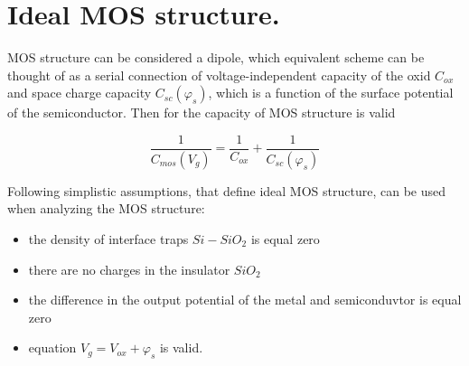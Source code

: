 \iffalse
\section{Ideálna štruktúra MOS.}  \index{MOS!ideálna štruktúra}
Štruktúru MOS možno považovať za dvojpól, ktorého náhradnú schému si
možno predstaviť ako sériové zapojenie napäťovonezávislej kapacity
oxidu $C_{ox}$ a kapacity oblasti priestorového náboja (OPN)
$C_{sc}(\varphi_{s})$, ktorá je funkciou povrchového potenciálu
polovodiča. Potom pre kapacitu štruktúry MOS platí \cite{I.1}
\fi
\section{Ideal MOS structure.}
MOS structure can be considered a dipole, which equivalent scheme can
be thought of as a serial connection of voltage-independent capacity
of the oxid $C_{ox}$ and space charge capacity $C_{sc}(\varphi_{s})$,
which is a function of the surface potential of the
semiconductor. Then for the capacity of MOS structure is valid
\cite{I.1}

\begin{equation}\label{eq:1.1}
\frac{1}{C_{mos}(V_g)} = \frac{1}{C_{ox}} + \frac{1}{C_{sc}(\varphi_s)}
\end{equation}

\iffalse
Pri analýze štruktúry MOS sa používajú následovné zjednodušujúce
predpoklady, ktoré definujú ideálnu štruktúru MOS:
\fi
Following simplistic assumptions, that define ideal MOS structure, can
be used when analyzing the MOS structure:

\iffalse
\begin{itemize}
\item hustota pascí rozhrania $Si-SiO_2$ je rovná nule 
\item v izolátore, ktorý tvorí $SiO_2$, sa nenachádzajú náboje 
\item rozdiel výstupných potenciálov z kovu a polovodiča je rovný nule
\item platí vzťah $V_{g}=V_{ox}+\varphi_{s}$  .
\end{itemize}
\fi
\begin{itemize}
\item the density of interface traps $Si-SiO_2$ is equal zero
\item there are no charges in the insulator $SiO_2$
\item the difference in the output potential of the metal and
  semiconduvtor is equal zero
\item equation $V_{g}=V_{ox}+\varphi_{s}$ is valid.
\end{itemize}

